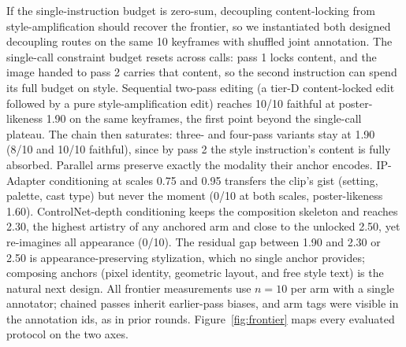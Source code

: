 If the single-instruction budget is zero-sum, decoupling content-locking from style-amplification should recover the frontier, so we instantiated both designed decoupling routes on the same 10 keyframes with shuffled joint annotation. The single-call constraint budget resets across calls: pass 1 locks content, and the image handed to pass 2 carries that content, so the second instruction can spend its full budget on style. Sequential two-pass editing (a tier-D content-locked edit followed by a pure style-amplification edit) reaches 10/10 faithful at poster-likeness 1.90 on the same keyframes, the first point beyond the single-call plateau. The chain then saturates: three- and four-pass variants stay at 1.90 (8/10 and 10/10 faithful), since by pass 2 the style instruction's content is fully absorbed. Parallel arms preserve exactly the modality their anchor encodes. IP-Adapter conditioning at scales 0.75 and 0.95 transfers the clip's gist (setting, palette, cast type) but never the moment (0/10 at both scales, poster-likeness 1.60). ControlNet-depth conditioning keeps the composition skeleton and reaches 2.30, the highest artistry of any anchored arm and close to the unlocked 2.50, yet re-imagines all appearance (0/10). The residual gap between 1.90 and 2.30 or 2.50 is appearance-preserving stylization, which no single anchor provides; composing anchors (pixel identity, geometric layout, and free style text) is the natural next design. All frontier measurements use $n=10$ per arm with a single annotator; chained passes inherit earlier-pass biases, and arm tags were visible in the annotation ids, as in prior rounds. Figure~\ref{fig:frontier} maps every evaluated protocol on the two axes.

